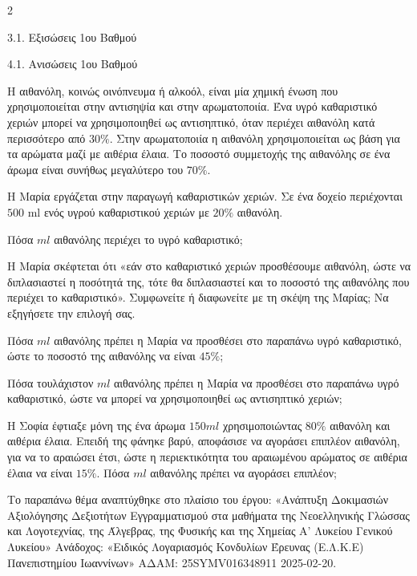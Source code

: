 \begin{ylh}{2}
    \item 3.1. Εξισώσεις 1ου Βαθμού
    \item 4.1. Ανισώσεις 1ου Βαθμού
\end{ylh}
Η αιθανόλη, κοινώς οινόπνευμα ή αλκοόλ, είναι μία χημική ένωση που χρησιμοποιείται στην αντισηψία και στην αρωματοποιία. Ένα υγρό καθαριστικό χεριών μπορεί να χρησιμοποιηθεί ως αντισηπτικό, όταν περιέχει αιθανόλη κατά περισσότερο από $30\%$. Στην αρωματοποιία η αιθανόλη χρησιμοποιείται ως βάση για τα αρώματα μαζί με αιθέρια έλαια. Το ποσοστό συμμετοχής της αιθανόλης σε ένα άρωμα είναι συνήθως μεγαλύτερο του $70\%$.

\begin{alist}
\item Η Μαρία εργάζεται στην παραγωγή καθαριστικών χεριών. Σε ένα δοχείο περιέχονται $500$ ml ενός υγρού καθαριστικού χεριών με $20\%$ αιθανόλη.

\begin{rlist}
\item Πόσα $ml$ αιθανόλης περιέχει το υγρό καθαριστικό;
\item Η Μαρία σκέφτεται ότι «εάν στο καθαριστικό χεριών προσθέσουμε αιθανόλη, ώστε να διπλασιαστεί η ποσότητά της, τότε θα διπλασιαστεί και το ποσοστό της αιθανόλης που περιέχει το καθαριστικό». Συμφωνείτε ή διαφωνείτε με τη σκέψη της Μαρίας; Να εξηγήσετε την επιλογή σας.
\item Πόσα $ml$ αιθανόλης πρέπει η Μαρία να προσθέσει στο παραπάνω υγρό καθαριστικό, ώστε το ποσοστό της αιθανόλης να είναι $45\%$;
\item Πόσα τουλάχιστον $ml$ αιθανόλης πρέπει η Μαρία να προσθέσει στο παραπάνω υγρό καθαριστικό, ώστε να μπορεί να χρησιμοποιηθεί ως αντισηπτικό χεριών;
\end{rlist}
\item Η Σοφία έφτιαξε μόνη της ένα άρωμα $150ml$ χρησιμοποιώντας $80\%$ αιθανόλη και αιθέρια έλαια. Επειδή της φάνηκε βαρύ, αποφάσισε να αγοράσει επιπλέον αιθανόλη, για να το αραιώσει έτσι, ώστε η περιεκτικότητα του αραιωμένου αρώματος σε αιθέρια έλαια να είναι $15\%$. Πόσα $ml$ αιθανόλης πρέπει να αγοράσει επιπλέον;

{\footnotesize Το παραπάνω θέμα αναπτύχθηκε στο πλαίσιο του έργου: «Ανάπτυξη Δοκιμασιών Αξιολόγησης Δεξιοτήτων Εγγραμματισμού στα μαθήματα της Νεοελληνικής Γλώσσας και Λογοτεχνίας, της Άλγεβρας, της Φυσικής και της Χημείας Α' Λυκείου Γενικού Λυκείου» Ανάδοχος: «Ειδικός Λογαριασμός Κονδυλίων Έρευνας (Ε.Λ.Κ.Ε) Πανεπιστημίου Ιωαννίνων» ΑΔΑΜ: 25SYMV016348911 2025-02-20.}
\end{alist}

